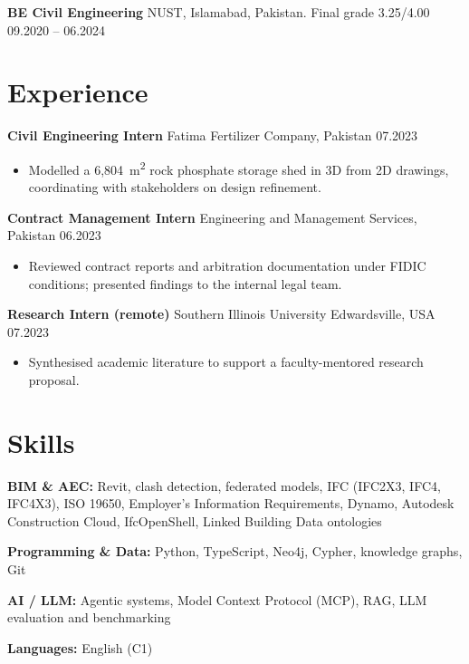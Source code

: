 \documentclass[a4paper,10.5pt]{article}
\newcommand{\datefill}{\dotfill}
\newcommand{\entry}[3]{\vspace{2.5pt}\noindent\textbf{#1} \textbar{} #2 \datefill{} #3\par\vspace{0.5pt}}
\newcommand{\skillrow}[2]{\noindent\textbf{#1:} #2\par\vspace{1pt}}
\begin{document}
\entry{BE Civil Engineering}{NUST, Islamabad, Pakistan. Final grade 3.25/4.00}{09.2020 -- 06.2024}

\section{Experience}
\entry{Civil Engineering Intern}{Fatima Fertilizer Company, Pakistan}{07.2023}
\begin{itemize}
  \item Modelled a 6,804~m\textsuperscript{2} rock phosphate storage shed in 3D from
        2D drawings, coordinating with stakeholders on design refinement.
\end{itemize}

\entry{Contract Management Intern}{Engineering and Management Services, Pakistan}{06.2023}
\begin{itemize}
  \item Reviewed contract reports and arbitration documentation under FIDIC
        conditions; presented findings to the internal legal team.
\end{itemize}

\entry{Research Intern (remote)}{Southern Illinois University Edwardsville, USA}{07.2023}
\begin{itemize}
  \item Synthesised academic literature to support a faculty-mentored research proposal.
\end{itemize}

\section{Skills}

\skillrow{BIM \& AEC}{Revit, clash detection, federated models, IFC (IFC2X3, IFC4, IFC4X3), ISO 19650, Employer's Information Requirements, Dynamo, Autodesk Construction Cloud, IfcOpenShell, Linked Building Data ontologies}
\skillrow{Programming \& Data}{Python, TypeScript, Neo4j, Cypher, knowledge graphs, Git}
\skillrow{AI / LLM}{Agentic systems, Model Context Protocol (MCP), RAG, LLM evaluation and benchmarking}

\skillrow{Languages}{English (C1)}
\end{document}
